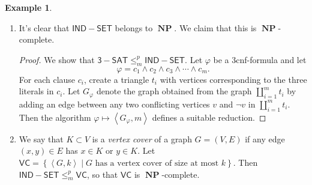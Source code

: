 \documentclass[10pt,letterpaper,cm]{nupset}
\theoremstyle{definition}
\newtheorem{exmp}[definition]{Example}
\theoremstyle{theorem}
\theoremstyle{remark}
\newcommand{\1}{\mathbf{1}}
\newcommand{\0}{\vec 0}
\DeclareMathOperator{\NP}{\mathbf{NP}}
\begin{document}
\begin{exmp}
\begin{enumerate}
\begin{proof}
Let $g_1, \ldots, g_n$ and $x_1, \ldots, x_m$ denote  the Boolean values given by the edges and inputs of $C$, respectively. Relabel $g_1, \ldots, g_n, x_1, \ldots, x_m$ as $w_1, \ldots, w_{n+m}$. Let $\varphi$ be the 3cnf formula in the variables $w_1, \ldots, w_{n+m}$ where each clause of $\varphi$ corresponds either to $C$'s output value $w_s \vee w_s \vee w_s$ or to one of $C$'s internal edges. In the latter case, we can give the following descriptions.
\begin{itemize}
\item  If $w_j = \neg w_i$, then $\varphi$ contains exactly one clause of the form $$  \left(w_i \vee w_j\right) \land \left(\neg w_i \vee \neg w_j\right).
$$
\item If $w_h = w_i \land w_j$ in $C$, then $\varphi$ contains exactly one clause of the form $$  \left(w_i \vee w_j \vee \neg w_h\right) \land \left(w_i \vee \neg w_j \vee \neg w_h\right) \land \left(\neg w_i \vee w_j \vee \neg w_h\right) \land \left(\neg w_i \vee \neg w_j \vee w_h\right).$$
\item If $w_h = w_i \vee w_j$ in $C$, then $\varphi$ contains exactly one clause of the form $$ \left(w_i \vee w_j \vee \neg w_h\right) \land \left(w_i \vee \neg w_j \vee w_h\right) \land \left(\neg w_i \vee w_j \vee w_h\right) \land \left(\neg w_i \vee \neg w_j \vee w_h\right)
.$$
\end{itemize} By construction, $\varphi$ is satisfiable if and only if $C$ is. The algorithm $M: \left\langle C \right\rangle \mapsto \varphi$ is linear in $n^k$, hence efficient. Therefore, it is a suitable reduction. 
\end{proof}
\pagebreak
\item  It's clear that $\mathsf{IND{-}SET}$ belongs to $\NP$. We claim that this is $\NP$-complete.
\begin{proof}
We show that $\mathsf{3{-}SAT} \leq_m^p \mathsf{IND{-}SET}$.  Let $\varphi$ be a 3cnf-formula and let $$\varphi = c_1 \land c_2 \land c_3 \land \cdots \land c_m.$$ For each clause $c_i$, create a triangle $t_i$ with vertices corresponding to the three literals in $c_i$. Let $G_{\varphi}$ denote the graph obtained from the graph $\coprod_{i=1}^m t_i$ by adding an edge between any two conflicting vertices $v$ and $\neg v$ in $\coprod_{i=1}^m t_i$. Then the algorithm $\varphi \mapsto \left\langle G_{\varphi}, m\right\rangle$ defines a suitable reduction. 
\end{proof}
\item We say that $K \subset V$ is a \textit{vertex cover} of a graph $G=\left(V, E\right)$ if any edge $\left(x,y\right) \in E$ has $x\in K$ or $y\in K$. Let $\mathsf{VC}= \left\{ \left\langle G, k\right\rangle \mid G\text{ has a vertex cover of size at most }k\right\}$. Then $\mathsf{IND{-}SET} \leq_m^p \mathsf{VC}$, so that $\mathsf{VC}$ is $\NP$-complete.  

\end{enumerate}
\end{exmp}
\end{document}
